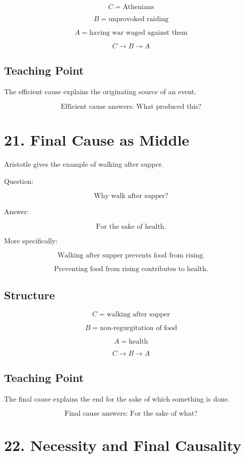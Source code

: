 \documentclass[12pt]{article}
\begin{document}
\[
C = \text{Athenians}
\]

\[
B = \text{unprovoked raiding}
\]

\[
A = \text{having war waged against them}
\]

\[
C \rightarrow B \rightarrow A
\]

\subsection*{Teaching Point}

The efficient cause explains the originating source of an event.

\[
\boxed{
\text{Efficient cause answers: What produced this?}
}
\]

\section*{21. Final Cause as Middle}

Aristotle gives the example of walking after supper.

Question:

\[
\text{Why walk after supper?}
\]

Answer:

\[
\text{For the sake of health.}
\]

More specifically:

\[
\text{Walking after supper prevents food from rising.}
\]

\[
\text{Preventing food from rising contributes to health.}
\]

\subsection*{Structure}

\[
C = \text{walking after supper}
\]

\[
B = \text{non-regurgitation of food}
\]

\[
A = \text{health}
\]

\[
C \rightarrow B \rightarrow A
\]

\subsection*{Teaching Point}

The final cause explains the end for the sake of which something is done.

\[
\boxed{
\text{Final cause answers: For the sake of what?}
}
\]

\section*{22. Necessity and Final Causality}
\end{document}
